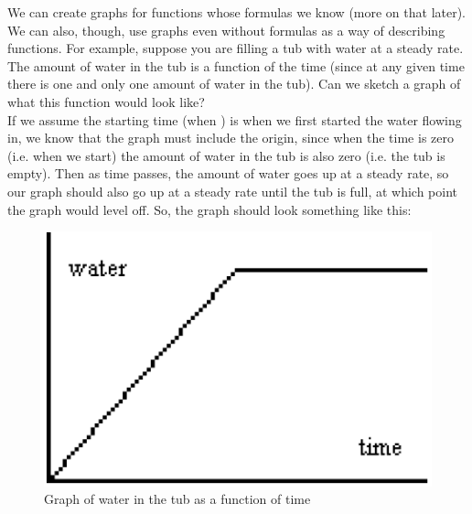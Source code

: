 
\bigskip

We can create graphs for functions whose formulas we know (more on that later). We can also, though, use graphs even without formulas as a way of describing functions. For example, suppose you are filling a tub with water at a steady rate. The amount of water in the tub is a function of the time (since at any given time there is one and only one amount of water in the tub). Can we sketch a graph of what this function would look like?\\

If we assume the starting time (when ) is when we first started the water flowing in, we know that the graph must include the origin, since when the time is zero (i.e. when we start) the amount of water in the tub is also zero (i.e. the tub is empty). Then as time passes, the amount of water goes up at a steady rate, so our graph should also go up at a steady rate until the tub is full, at which point the graph would level off. So, the graph should look something like this:

\begin{figure}[H]
	\centering
	\includegraphics[scale=1.0]{Sections/FunctionsandGraphsImages/Figure12.png}
	\caption{Graph of water in the tub as a function of time}
\end{figure}

